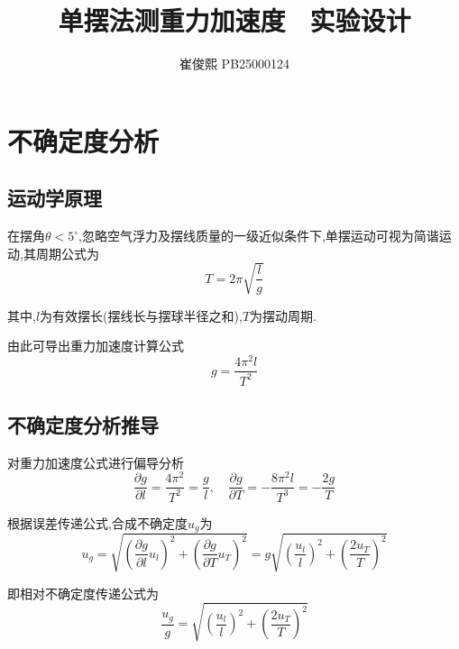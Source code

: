\documentclass[9pt,a4paper,twoside]{../rho-class/rho}
\title{单摆法测重力加速度 \  实验设计}
\author{崔俊熙 PB25000124}
\begin{document}
\onecolumn
\maketitle
\thispagestyle{firststyle}

\section{不确定度分析}

\subsection{运动学原理}
在摆角$\theta < 5^\circ$,忽略空气浮力及摆线质量的一级近似条件下,单摆运动可视为简谐运动,其周期公式为
\begin{equation}
    T = 2\pi\sqrt{\frac{l}{g}}
\end{equation}

其中,$l$为有效摆长(摆线长与摆球半径之和),$T$为摆动周期.

由此可导出重力加速度计算公式
\begin{equation}
    g = \frac{4\pi^2 l}{T^2}
\end{equation}

\subsection{不确定度分析推导}
对重力加速度公式进行偏导分析
\begin{equation}
    \frac{\partial g}{\partial l} = \frac{4\pi^2}{T^2} = \frac{g}{l}, \quad \frac{\partial g}{\partial T} = -\frac{8\pi^2 l}{T^3} = -\frac{2g}{T}
\end{equation}

根据误差传递公式,合成不确定度$u_g$为
\begin{equation}
    u_g = \sqrt{\left( \frac{\partial g}{\partial l} u_l \right)^2 + \left( \frac{\partial g}{\partial T} u_T \right)^2} = g \sqrt{\left( \frac{u_l}{l} \right)^2 + \left( \frac{2u_T}{T} \right)^2}
\end{equation}

即相对不确定度传递公式为
\begin{equation}
    \frac{u_g}{g} = \sqrt{\left( \frac{u_l}{l} \right)^2 + \left( \frac{2u_T}{T} \right)^2}
\end{equation}
\end{document}
